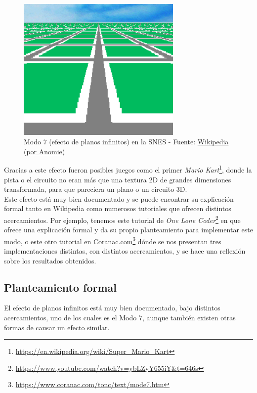 \begin{figure}[h]
	\centering
	\includegraphics[width=8cm]{archivos/mode7}
	\caption{Modo 7 (efecto de planos infinitos) en la SNES - Fuente: \href{https://en.wikipedia.org/wiki/Mode_7\#/media/File:Mode_7_Test-0000.png}{Wikipedia (por Anomie)}}
	\label{fig:mode7}
\end{figure}

Gracias a este efecto fueron posibles juegos como el primer \emph{Mario Kart}\footnote{\url{https://en.wikipedia.org/wiki/Super_Mario_Kart}}, donde la pista o el circuito no eran más que una textura 2D de grandes dimensiones transformada, para que pareciera un plano o un circuito 3D.\\

Este efecto está muy bien documentado y se puede encontrar su explicación formal tanto en Wikipedia como numerosos tutoriales que ofrecen distintos acercamientos. Por ejemplo, tenemos este tutorial de \emph{One Lone Coder}\footnote{\url{https://www.youtube.com/watch?v=ybLZyY655iY&t=646s}} en que ofrece una explicación formal y da su propio planteamiento para implementar este modo, o este otro tutorial en Coranac.com\footnote{\url{https://www.coranac.com/tonc/text/mode7.htm}} dónde se nos presentan tres implementaciones distintas, con distintos acercamientos, y se hace una reflexión sobre los resultados obtenidos.

\subsection{Planteamiento formal}

El efecto de planos infinitos está muy bien documentado, bajo distintos acercamientos, uno de los cuales es el Modo 7, aunque también existen otras formas de causar un efecto similar.\\

